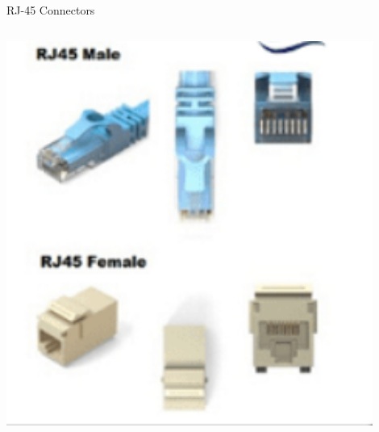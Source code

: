 \documentclass[aspectratio=169]{beamer}
\begin{document}
\begin{frame}{RJ-45 Connectors}
\begin{columns}[T]
\begin{column}{0.4\textwidth}
            \vspace{0.3cm}
            \includegraphics[width=0.9\textwidth]{RJ45_connect.png}
        \end{column}
    \end{columns}
\end{frame}
\end{document}
